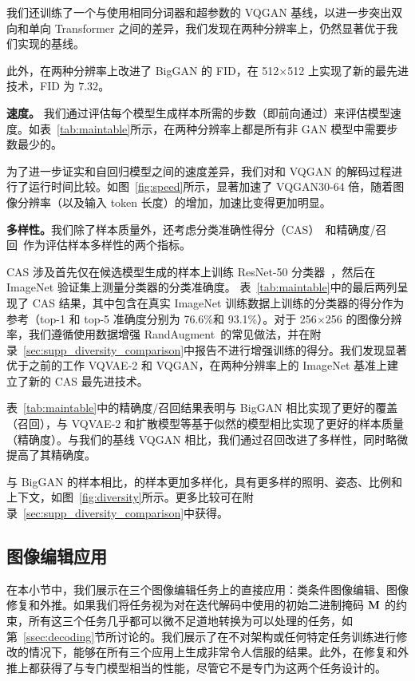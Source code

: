 %
我们还训练了一个与\model 使用相同分词器和超参数的 VQGAN 基线，以进一步突出双向和单向 Transformer 之间的差异，我们发现在两种分辨率上，\model 仍然显著优于我们实现的基线。

此外，\model 在两种分辨率上改进了 BigGAN 的 FID，在 512$\times$512 上实现了新的最先进技术，FID 为 $7.32$。


{


}


\noindent\textbf{速度。}
我们通过评估每个模型生成样本所需的步数（即前向通过）来评估模型速度。如表~\ref{tab:maintable}所示，\model 在两种分辨率上都是所有非 GAN 模型中需要步数最少的。

为了进一步证实\model 和自回归模型之间的速度差异，我们对\model 和 VQGAN 的解码过程进行了运行时间比较。如图~\ref{fig:speed}所示，\model 显著加速了 VQGAN$30$-$64$ 倍，随着图像分辨率（以及输入 token 长度）的增加，加速比变得更加明显。


\noindent\textbf{多样性。}我们除了样本质量外，还考虑分类准确性得分（CAS）~\cite{Ravuri19CAS}和精确度/召回~\cite{KynkaanniemiKLL19}作为评估样本多样性的两个指标。

CAS 涉及首先仅在候选模型生成的样本上训练 ResNet-50 分类器~\cite{ResNet}，然后在 ImageNet 验证集上测量分类器的分类准确度。
表~\ref{tab:maintable}中的最后两列呈现了 CAS 结果，其中包含在真实 ImageNet 训练数据上训练的分类器的得分作为参考（top-1 和 top-5 准确度分别为 76.6\%和 93.1\%）。对于 256$\times$256 的图像分辨率，我们遵循使用数据增强 RandAugment~\cite{cubuk2019randaugment}的常见做法，并在附录~\ref{sec:supp_diversity_comparison}中报告不进行增强训练的得分。我们发现\model 显著优于之前的工作 VQVAE-2 和 VQGAN，在两种分辨率上的 ImageNet 基准上建立了新的 CAS 最先进技术。


表~\ref{tab:maintable}中的精确度/召回结果表明\model 与 BigGAN 相比实现了更好的覆盖（召回），与 VQVAE-2 和扩散模型等基于似然的模型相比实现了更好的样本质量（精确度）。与我们的基线 VQGAN 相比，我们通过召回改进了多样性，同时略微提高了其精确度。

与 BigGAN 的样本相比，\model 的样本更加多样化，具有更多样的照明、姿态、比例和上下文，如图~\ref{fig:diversity}所示。更多比较可在附录~\ref{sec:supp_diversity_comparison}中获得。

\subsection{图像编辑应用}
\label{ssec:applications}
在本小节中，我们展示\model 在三个图像编辑任务上的直接应用：类条件图像编辑、图像修复和外推。如果我们将任务视为对\model 在迭代解码中使用的初始二进制掩码 ${\mathbf{M}}$ 的约束，所有这三个任务几乎都可以微不足道地转换为\model 可以处理的任务，如第~\ref{ssec:decoding}节所讨论的。我们展示了在不对架构或任何特定任务训练进行修改的情况下，\model 能够在所有三个应用上生成非常令人信服的结果。此外，\model 在修复和外推上都获得了与专门模型相当的性能，尽管它不是专门为这两个任务设计的。

